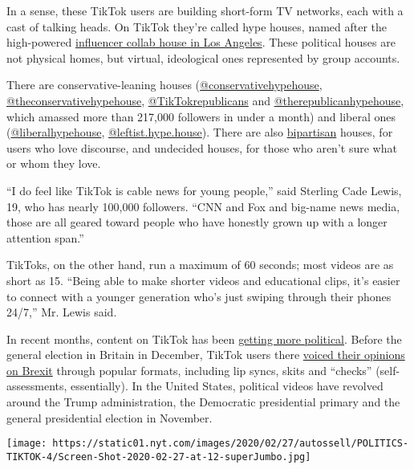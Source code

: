 In a sense, these TikTok users are building short-form TV networks, each
with a cast of talking heads. On TikTok they're called hype houses,
named after the high-powered
\href{https://www.nytimes.com/2020/01/03/style/hype-house-los-angeles-tik-tok.html}{influencer
collab house in Los Angeles}. These political houses are not physical
homes, but virtual, ideological ones represented by group accounts.

There are conservative-leaning houses
(\href{https://www.tiktok.com/@conservativehypehouse}{@conservativehypehouse},
\href{https://www.tiktok.com/@theconservativehypehouse}{@theconservativehypehouse},
\href{https://www.tiktok.com/@tiktokrepublicans}{@TikTokrepublicans} and
\href{https://www.tiktok.com/@therepublicanhypehouse}{@therepublicanhypehouse},
which amassed more than 217,000 followers in under a month) and liberal
ones
(\href{https://www.tiktok.com/@liberalhypehouse}{@liberalhypehouse},
\href{https://www.tiktok.com/@leftist.hype.house}{@leftist.hype.house}).
There are also \href{https://www.tiktok.com/@camdean699}{bipartisan}
houses, for users who love discourse, and undecided houses, for those
who aren't sure what or whom they love.

``I do feel like TikTok is cable news for young people,'' said Sterling
Cade Lewis, 19, who has nearly 100,000 followers. ``CNN and Fox and
big-name news media, those are all geared toward people who have
honestly grown up with a longer attention span.''

TikToks, on the other hand, run a maximum of 60 seconds; most videos are
as short as 15. ``Being able to make shorter videos and educational
clips, it's easier to connect with a younger generation who's just
swiping through their phones 24/7,'' Mr. Lewis said.

In recent months, content on TikTok has been
\href{https://www.vox.com/the-goods/2020/1/22/21069469/tiktok-memes-funny-ww3-politics-impeachment-fires}{getting
more political}. Before the general election in Britain in December,
TikTok users there
\href{https://www.dazeddigital.com/politics/article/47105/1/general-election-tiktok-memes-boris-johnson-jeremy-corbyn-tory-labour}{voiced
their opinions on Brexit} through popular formats, including lip syncs,
skits and ``checks'' (self-assessments, essentially). In the United
States, political videos have revolved around the Trump administration,
the Democratic presidential primary and the general presidential
election in November.

\texttt{[image: https://static01.nyt.com/images/2020/02/27/autossell/POLITICS-TIKTOK-4/Screen-Shot-2020-02-27-at-12-superJumbo.jpg]}

